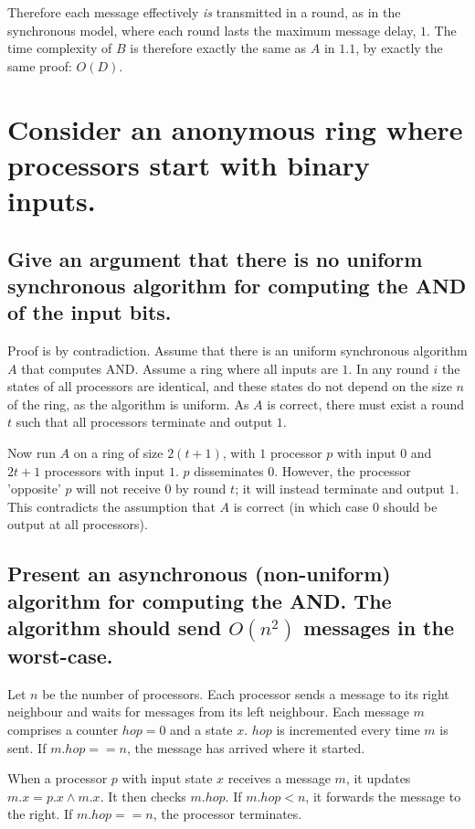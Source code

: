 \documentclass[11pt]{article} %
\begin{document}
Therefore each message effectively \textit{is} transmitted in a round, as in the synchronous model, where each round lasts the maximum message delay, $1$. The time complexity of $B$ is therefore exactly the same as $A$ in $1.1$, by exactly the same proof: $O(D)$.

\section{Consider an anonymous ring where processors start with binary inputs.}

\subsection{Give an argument that there is no uniform synchronous algorithm for computing the AND of the input bits.}

Proof is by contradiction. Assume that there is an uniform synchronous algorithm $A$ that computes AND. Assume a ring where all inputs are $1$. In any round $i$ the states of all processors are identical, and these states do not depend on the size $n$ of the ring, as the algorithm is uniform. As $A$ is correct, there must exist a round $t$ such that all processors terminate and output $1$.

Now run $A$ on a ring of size $2(t + 1)$, with $1$ processor $p$ with input $0$ and $2t + 1$ processors with input $1$. $p$ disseminates $0$. However, the processor 'opposite' $p$ will not receive $0$ by round $t$; it will instead terminate and output $1$. This contradicts the assumption that $A$ is correct (in which case $0$ should be output at all processors).  

\subsection{Present an asynchronous (non-uniform) algorithm for computing the AND. The algorithm should send $O(n^2)$ messages in the worst-case.}

Let $n$ be the number of processors. Each processor sends a message to its right neighbour and waits for messages from its left neighbour. Each message $m$ comprises a counter $hop = 0$ and a state $x$. $hop$ is incremented every time $m$ is sent. If $m.hop == n$, the message has arrived where it started. 

When a processor $p$ with input state $x$ receives a message $m$, it updates $m.x = p.x \land m.x$. It then checks $m.hop$. If $m.hop < n$, it forwards the message to the right. If $m.hop == n$, the processor terminates. 
\end{document}
